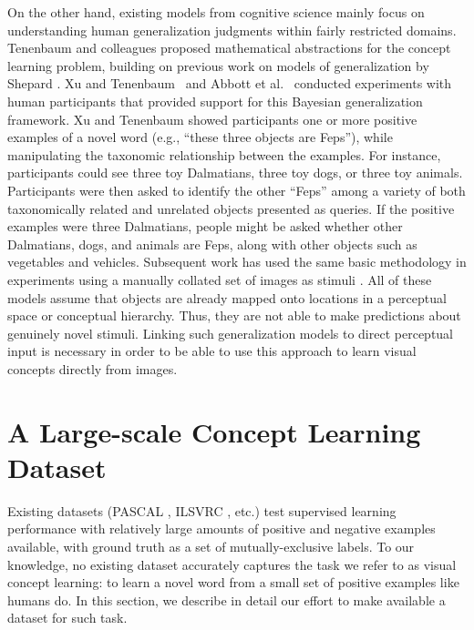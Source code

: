 On the other hand, existing models from cognitive science mainly focus on understanding
human generalization judgments within fairly restricted domains. Tenenbaum
and colleagues \cite{tenenbaum99,tenenbaum2001generalization} proposed
mathematical abstractions for the concept learning problem, building on
previous work on models of generalization by Shepard \cite{shepard87}. Xu
and Tenenbaum~\cite{xu2007word} and Abbott et al.~\cite{abbott2012} conducted
experiments with human participants that provided support for this
Bayesian generalization framework. Xu and Tenenbaum \cite{xu2007word} showed participants one or more positive examples of a novel word (e.g., ``these three objects are Feps''), while manipulating the taxonomic relationship between the examples. For instance, participants could see three toy Dalmatians, three toy dogs, or three toy animals. Participants were then asked to identify the other ``Feps'' among a variety of both taxonomically related and unrelated objects presented as queries. If the positive examples were three Dalmatians, people might be asked whether other Dalmatians, dogs, and animals are Feps, along with other objects such as vegetables and vehicles. Subsequent work has used the same basic methodology in experiments using a manually collated set of images as stimuli \cite{abbott2012}. All of these models assume that objects
are already mapped onto locations in a perceptual space or conceptual
hierarchy. Thus, they are not able to make predictions about genuinely
novel stimuli. Linking such generalization models to direct perceptual
input is necessary in order to be able to use this approach to learn
visual concepts directly from images.




\section{A Large-scale Concept Learning Dataset}\label{sec:mechturk}

Existing datasets (PASCAL \cite{pascal}, ILSVRC \cite{ilsvrc}, etc.) test supervised learning performance with relatively large amounts of positive and negative examples available, with ground truth as a set of mutually-exclusive labels. To our knowledge, no existing dataset accurately captures the task we refer to as visual concept learning: to learn a novel word from a small set of positive examples like humans do. In this section, we describe in detail our effort to make available a dataset for such task.


